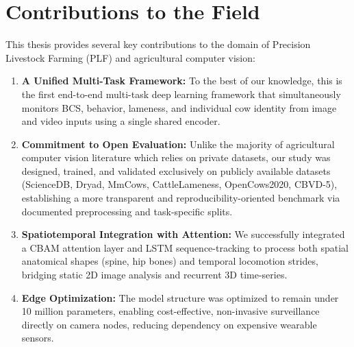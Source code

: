 \section{Contributions to the Field}
This thesis provides several key contributions to the domain of Precision Livestock Farming (PLF) and agricultural computer vision:
\begin{enumerate}
    \item \textbf{A Unified Multi-Task Framework:} To the best of our knowledge, this is the first end-to-end multi-task deep learning framework that simultaneously monitors BCS, behavior, lameness, and individual cow identity from image and video inputs using a single shared encoder.
    \item \textbf{Commitment to Open Evaluation:} Unlike the majority of agricultural computer vision literature which relies on private datasets, our study was designed, trained, and validated exclusively on publicly available datasets (ScienceDB, Dryad, MmCows, CattleLameness, OpenCows2020, CBVD-5), establishing a more transparent and reproducibility-oriented benchmark via documented preprocessing and task-specific splits.
    \item \textbf{Spatiotemporal Integration with Attention:} We successfully integrated a CBAM attention layer and LSTM sequence-tracking to process both spatial anatomical shapes (spine, hip bones) and temporal locomotion strides, bridging static 2D image analysis and recurrent 3D time-series.
    \item \textbf{Edge Optimization:} The model structure was optimized to remain under 10 million parameters, enabling cost-effective, non-invasive surveillance directly on camera nodes, reducing dependency on expensive wearable sensors.
\end{enumerate}

